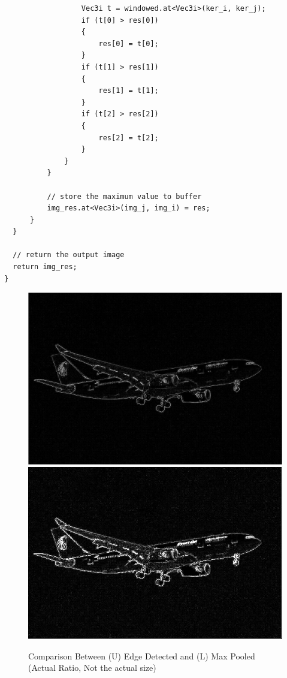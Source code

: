 \documentclass[12pt,a4paper]{report}
\begin{document}
\begin{lstlisting}
                  Vec3i t = windowed.at<Vec3i>(ker_i, ker_j);
                  if (t[0] > res[0])
                  {
                      res[0] = t[0];
                  }
                  if (t[1] > res[1])
                  {
                      res[1] = t[1];
                  }
                  if (t[2] > res[2])
                  {
                      res[2] = t[2];
                  }
              }
          }

          // store the maximum value to buffer
          img_res.at<Vec3i>(img_j, img_i) = res;
      }
  }

  // return the output image
  return img_res;
}
\end{lstlisting}
\begin{figure}[!htb]
  \centering
  \includegraphics[scale=0.3]{result_img/aeroplane_Q2.png}
  \includegraphics[scale=0.3]{result_img/aeroplane_Q3.png}
  \caption{Comparison Between (U) Edge Detected and (L) Max Pooled (Actual Ratio, Not the actual size)}
\end{figure}
\clearpage
\end{document}
